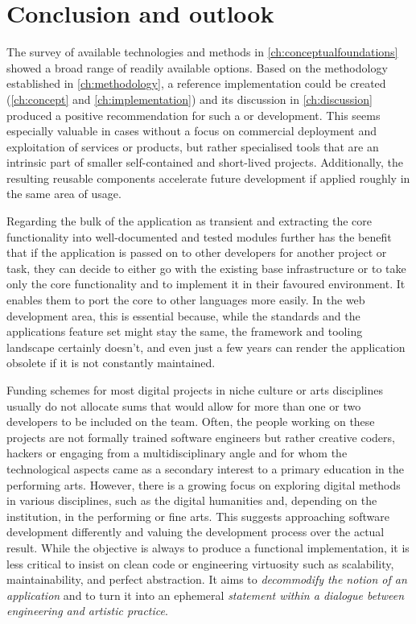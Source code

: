 \chapter{Conclusion and outlook}
\label{ch:conclusion-and-outlook}

The survey of available technologies and methods in \autoref{ch:conceptualfoundations} showed a broad range of readily available options.
Based on the methodology established in \autoref{ch:methodology}, a reference implementation could be created (\autoref{ch:concept} and \autoref{ch:implementation}) and its discussion in \autoref{ch:discussion} produced a positive recommendation for such a  or  development.
This seems especially valuable in cases without a focus on commercial deployment and exploitation of services or products, but rather specialised tools that are an intrinsic part of smaller self-contained and short-lived projects.
Additionally, the resulting reusable components accelerate future development if applied roughly in the same area of usage.

Regarding the bulk of the application as transient and extracting the core functionality into well-documented and tested modules further has the benefit that if the application is passed on to other developers for another project or task, they can decide to either go with the existing base infrastructure or to take only the core functionality and to implement it in their favoured environment.
It enables them to port the core to other languages more easily.
In the web development area, this is essential because, while the standards and the application\textquotesingle s feature set might stay the same, the framework and tooling landscape certainly doesn't, and even just a few years can render the application obsolete if it is not constantly maintained.

Funding schemes for most digital projects in niche culture or arts disciplines usually do not allocate sums that would allow for more than one or two developers to be included on the team.
Often, the people working on these projects are not formally trained software engineers but rather creative coders, hackers or engaging from a multidisciplinary angle and for whom the technological aspects came as a secondary interest to a primary education in the performing arts.
However, there is a growing focus on exploring digital methods in various disciplines, such as the digital humanities and, depending on the institution, in the performing or fine arts.
This suggests approaching software development differently and valuing the development process over the actual result.
While the objective is always to produce a functional implementation, it is less critical to insist on clean code or engineering virtuosity such as scalability, maintainability, and perfect abstraction.
It aims to \emph{decommodify the notion of an application} and to turn it into an ephemeral \emph{statement within a dialogue between engineering and artistic practice}.

